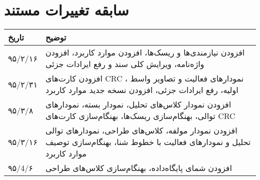 
\chapter{سابقه تغییرات مستند}

\begin{table}[H]
	\centering
	\begin{tabular}{|p{3cm}|p{5cm}|}
		\hline
		تاریخ & توضیح \\
		\hline
		
		۹۵/۲/۱۶  & افزودن نیازمندی‌ها و ریسک‌ها، افزودن موارد کاربرد، افزودن واژه‌نامه، ویرایش کلی سند و رفع ایرادات جزئی \\
		۹۵/۲/۳۱  & افزودن کارت‌های CRC ، نمودارهای فعالیت و تصاویر واسط اولیه، رفع ایرادات جزئی، افزودن نسخه جدید موارد کاربرد \\
		۹۵/۳/۸  & افزودن نمودار کلاس‌های تحلیل، نمودار بسته، نمودارهای توالی، بهنگام‌سازی ریسک‌ها، بهنگام‌سازی کارت‌های CRC \\
		۹۵/۳/۱۶  & افزودن نمودار مولفه، کلاس‌های طراحی، نمودارهای توالی تحلیل و نمودارهای فعالیت با خطوط شنا، بهنگام‌سازی توصیف موارد کاربرد \\
				۹۵/4/۶  & افزودن شمای پایگاه‌داده، بهنگام‌سازی کلاس‌های طراحی \\
				
		
		\hline
	\end{tabular}
\end{table}
